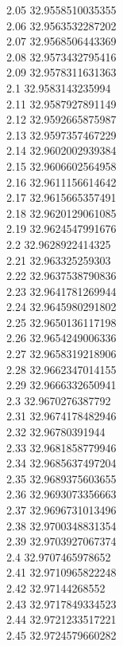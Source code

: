 {2.05	32.9558510035355\\
2.06	32.9563532287202\\
2.07	32.9568506443369\\
2.08	32.9573432795416\\
2.09	32.9578311631363\\
2.1	32.9583143235994\\
2.11	32.9587927891149\\
2.12	32.9592665875987\\
2.13	32.9597357467229\\
2.14	32.9602002939384\\
2.15	32.9606602564958\\
2.16	32.9611156614642\\
2.17	32.9615665357491\\
2.18	32.9620129061085\\
2.19	32.9624547991676\\
2.2	32.9628922414325\\
2.21	32.963325259303\\
2.22	32.9637538790836\\
2.23	32.9641781269944\\
2.24	32.9645980291802\\
2.25	32.9650136117198\\
2.26	32.9654249006336\\
2.27	32.9658319218906\\
2.28	32.9662347014155\\
2.29	32.9666332650941\\
2.3	32.9670276387792\\
2.31	32.9674178482946\\
2.32	32.96780391944\\
2.33	32.9681858779946\\
2.34	32.9685637497204\\
2.35	32.9689375603655\\
2.36	32.9693073356663\\
2.37	32.9696731013496\\
2.38	32.9700348831354\\
2.39	32.9703927067374\\
2.4	32.9707465978652\\
2.41	32.9710965822248\\
2.42	32.97144268552\\
2.43	32.9717849334523\\
2.44	32.9721233517221\\
2.45	32.9724579660282\\
}
